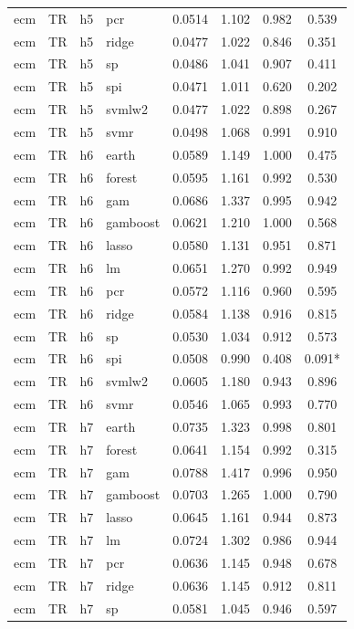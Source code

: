 \begin{ThreePartTable}
\begin{longtable}[t]{llclcccc}
ecm & TR & h5 & pcr & 0.0514 & 1.102 & 0.982 & 0.539\\
ecm & TR & h5 & ridge & 0.0477 & 1.022 & 0.846 & 0.351\\
ecm & TR & h5 & sp & 0.0486 & 1.041 & 0.907 & 0.411\\
ecm & TR & h5 & spi & 0.0471 & 1.011 & 0.620 & 0.202\\
ecm & TR & h5 & svmlw2 & 0.0477 & 1.022 & 0.898 & 0.267\\
ecm & TR & h5 & svmr & 0.0498 & 1.068 & 0.991 & 0.910\\
\addlinespace
ecm & TR & h6 & earth & 0.0589 & 1.149 & 1.000 & 0.475\\
ecm & TR & h6 & forest & 0.0595 & 1.161 & 0.992 & 0.530\\
ecm & TR & h6 & gam & 0.0686 & 1.337 & 0.995 & 0.942\\
ecm & TR & h6 & gamboost & 0.0621 & 1.210 & 1.000 & 0.568\\
ecm & TR & h6 & lasso & 0.0580 & 1.131 & 0.951 & 0.871\\
ecm & TR & h6 & lm & 0.0651 & 1.270 & 0.992 & 0.949\\
ecm & TR & h6 & pcr & 0.0572 & 1.116 & 0.960 & 0.595\\
ecm & TR & h6 & ridge & 0.0584 & 1.138 & 0.916 & 0.815\\
ecm & TR & h6 & sp & 0.0530 & 1.034 & 0.912 & 0.573\\
ecm & TR & h6 & spi & 0.0508 & 0.990 & 0.408 & 0.091*\\
ecm & TR & h6 & svmlw2 & 0.0605 & 1.180 & 0.943 & 0.896\\
ecm & TR & h6 & svmr & 0.0546 & 1.065 & 0.993 & 0.770\\
\addlinespace
ecm & TR & h7 & earth & 0.0735 & 1.323 & 0.998 & 0.801\\
ecm & TR & h7 & forest & 0.0641 & 1.154 & 0.992 & 0.315\\
ecm & TR & h7 & gam & 0.0788 & 1.417 & 0.996 & 0.950\\
ecm & TR & h7 & gamboost & 0.0703 & 1.265 & 1.000 & 0.790\\
ecm & TR & h7 & lasso & 0.0645 & 1.161 & 0.944 & 0.873\\
ecm & TR & h7 & lm & 0.0724 & 1.302 & 0.986 & 0.944\\
ecm & TR & h7 & pcr & 0.0636 & 1.145 & 0.948 & 0.678\\
ecm & TR & h7 & ridge & 0.0636 & 1.145 & 0.912 & 0.811\\
ecm & TR & h7 & sp & 0.0581 & 1.045 & 0.946 & 0.597\\

\end{longtable}
\end{ThreePartTable}
